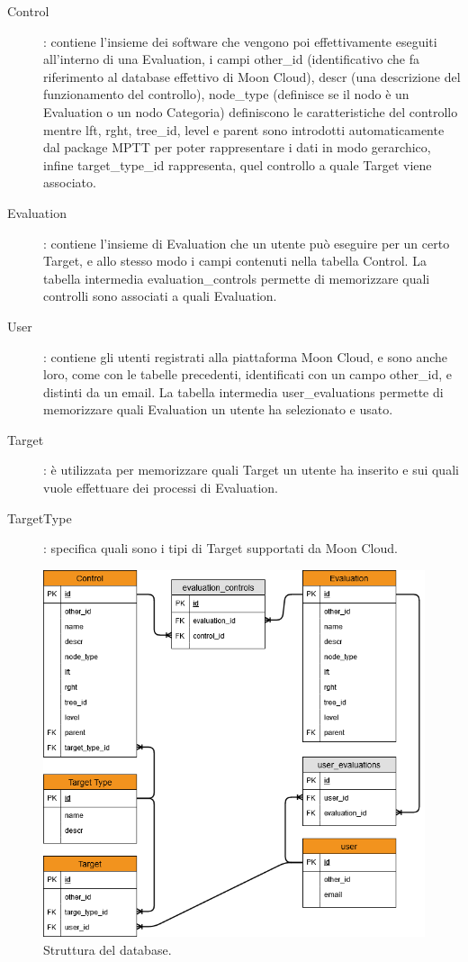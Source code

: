 \begin{description}
    \item[Control]: contiene l'insieme dei software che vengono poi effettivamente eseguiti all'interno di una Evaluation, 
    i campi other\_id (identificativo che fa riferimento al database effettivo di Moon Cloud), 
    descr (una descrizione del funzionamento del controllo), node\_type (definisce se il nodo è un Evaluation o un nodo Categoria) 
    definiscono le caratteristiche del controllo mentre lft, rght, tree\_id, level e parent sono introdotti 
    automaticamente dal package MPTT per poter rappresentare i dati in modo gerarchico, infine target\_type\_id rappresenta, quel 
    controllo a quale Target viene associato.
    \item[Evaluation]: contiene l'insieme di Evaluation che un utente può eseguire per un certo Target, e allo stesso modo 
    i campi contenuti nella tabella Control. La tabella intermedia evaluation\_controls permette di memorizzare quali controlli 
    sono associati a quali Evaluation.
    \item[User]: contiene gli utenti registrati alla piattaforma Moon Cloud, e sono anche loro, come con le tabelle precedenti, 
    identificati con un campo other\_id, e distinti da un email. La tabella intermedia user\_evaluations permette di memorizzare 
    quali Evaluation un utente ha selezionato e usato.
    \item[Target]: è utilizzata per memorizzare quali Target un utente ha inserito e sui quali vuole effettuare dei processi 
    di Evaluation.
    \item[TargetType]: specifica quali sono i tipi di Target supportati da Moon Cloud.
\end{description}
\begin{figure}
    \centering
    \includegraphics[scale=0.6]{images/MoonCloudRecommendation_ER.png}
    \caption{Struttura del database.}
    \label{fig:str_db_project}
\end{figure}
